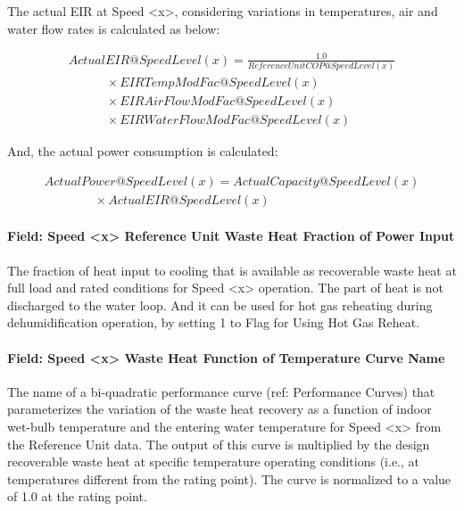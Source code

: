 The actual EIR at Speed \textless{}x\textgreater{}, considering variations in temperatures, air and water flow rates is calculated as below:

\begin{equation}
  \begin{array}{l}
    ActualEIR@SpeedLevel\left( x \right) = \frac{{1.0}}{{ReferenceUnitCOP@SpeedLevel(x)}} \\
    \quad \quad \quad \times EIRTempModFac@SpeedLevel(x) \\
    \quad \quad \quad \times EIRAirFlowModFac@SpeedLevel(x) \\
    \quad \quad \quad \times EIRWaterFlowModFac@SpeedLevel(x)
  \end{array}
\end{equation}

And, the actual power consumption is calculated:

\begin{equation}
  \begin{array}{l}
    ActualPower@SpeedLevel\left( x \right) = ActualCapacity@SpeedLevel\left( x \right) \\
    \quad \quad \quad \quad  \times ActualEIR@SpeedLevel\left( x \right)
  \end{array}
\end{equation}

\paragraph{Field: Speed \textless{}x\textgreater{} Reference Unit Waste Heat Fraction of Power Input}\label{field-speed-x-reference-unit-waste-heat-fraction-of-power-input}

The fraction of heat input to cooling that is available as recoverable waste heat at full load and rated conditions for Speed \textless{}x\textgreater{} operation. The part of heat is not discharged to the water loop. And it can be used for hot gas reheating during dehumidification operation, by setting 1 to Flag for Using Hot Gas Reheat.

\paragraph{Field: Speed \textless{}x\textgreater{} Waste Heat Function of Temperature Curve Name}\label{field-speed-x-waste-heat-function-of-temperature-curve-name-2}

The name of a bi-quadratic performance curve (ref: Performance Curves) that parameterizes the variation of the waste heat recovery as a function of indoor wet-bulb temperature and the entering water temperature for Speed \textless{}x\textgreater{} from the Reference Unit data. The output of this curve is multiplied by the design recoverable waste heat at specific temperature operating conditions (i.e., at temperatures different from the rating point). The curve is normalized to a value of 1.0 at the rating point.

